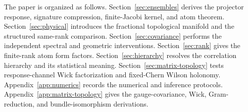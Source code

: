 The paper is organized as follows.
Section~\ref{sec:ensembles} derives the projector response, signature
compression, finite-Jacobi kernel, and atom theorem.
Section~\ref{sec:physical} introduces the fractional topological manifold and
the structured same-rank comparison.
Section~\ref{sec:covariance} performs the independent spectral and geometric
interventions.
Section~\ref{sec:rank} gives the finite-rank atom form factors.
Section~\ref{sec:hierarchy} resolves the correlation hierarchy and its
statistical meaning.
Section~\ref{sec:matrix-topology} tests response-channel Wick factorization
and fixed-Chern Wilson holonomy.
Appendix~\ref{app:numerics} records the numerical and inference protocols.
Appendix~\ref{app:matrix-topology} gives the gauge-covariance, Wick,
Gram-reduction, and bundle-isomorphism derivations.
